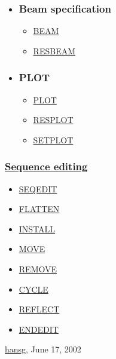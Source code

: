 \begin{itemize}
	\item 

\subsubsection{Beam specification}
\begin{itemize}
	\item \href{../Introduction/beam.html}{BEAM}
	\item \href{../Introduction/resbeam.html}{RESBEAM}
\end{itemize}


	\item 

\subsubsection{PLOT}
\begin{itemize}
	\item \href{../plot/plot.html}{PLOT}
	\item \href{../plot/plot.html#resplot}{RESPLOT}
	\item \href{../plot/plot.html#setplot}{SETPLOT}
\end{itemize}
\end{itemize}



\subsubsection{\href{seqedit.html}{Sequence editing}}
\begin{itemize}
	\item \href{seqedit.html#seqedit}{SEQEDIT}
	\item \href{seqedit.html#flatten}{FLATTEN}
	\item \href{seqedit.html#install}{INSTALL}
	\item \href{seqedit.html#move}{MOVE}
	\item \href{seqedit.html#remove}{REMOVE}
	\item \href{seqedit.html#cycle}{CYCLE}
	\item \href{seqedit.html#reflect}{REFLECT}
	\item \href{seqedit.html#endedit}{ENDEDIT}
\end{itemize}\href{http://www.cern.ch/Hans.Grote/hansg_sign.html}{hansg}, June 17, 2002 







%

